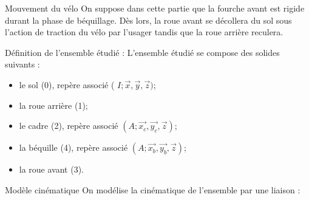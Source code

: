 Mouvement du vélo On suppose dans cette partie que la fourche avant est rigide durant la phase de béquillage. Dès lors, la roue avant se décollera du sol sous l'action de traction du vélo par l'usager tandis que la roue arrière reculera.

Définition de l'ensemble étudié : L'ensemble étudié se compose des solides suivants :

\begin{itemize}
  \item le sol (0), repère associé ( \(I ; \vec{x}, \vec{y}, \vec{z})\);
  \item la roue arrière (1);
  \item le cadre (2), repère associé \(\left(A ; \overrightarrow{x_{c}}, \overrightarrow{y_{c}}, \vec{z}\right)\);
  \item la béquille (4), repère associé \(\left(A ; \overrightarrow{x_{b}}, \overrightarrow{y_{b}}, \vec{z}\right)\);
  \item la roue avant (3).
\end{itemize}

Modèle cinématique On modélise la cinématique de l'ensemble par une liaison :


